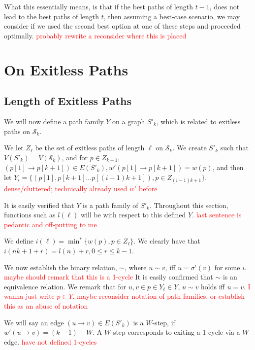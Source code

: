 \documentclass{article}
\theoremstyle{definition}
\newcommand{\edit}[1]{\textcolor{red}{#1}}
\begin{document}
{What this essentially means, is that if the best paths of length $t-1$, does not lead to the best paths of length $t$, then assuming a best-case scenario, we may consider if we used the second best option at one of these steps and proceeded optimally.\edit{ probably rewrite a reconsider where this is placed}

\section{On Exitless Paths} \label{bounding i}

\subsection{Length of Exitless Paths}

We will now define a path family $Y$ on a graph $S'_k$, which is related to exitless paths on $\mathcal{S}_k$.

\vspace{1.75em}

We let $Z_\ell$ be the set of exitless paths of length $\ell$ on $\mathcal{S}_k$. We create $S'_k$ such that $V(S'_k) = V(\mathcal{S}_k)$, and for $p \in Z_{k+1}$, $(p[1]\to p[k+1]) \in E(S'_k), w'(p[1]\to p[k+1]) = w(p)$, and then let $Y_i = \{(p[1], p[k+1]\dots p[(i-1)k+1]), p \in Z_{(i-1)k+1}\}$.\edit{ dense/cluttered; technically already used $w'$ before}

It is easily verified that $Y$ is a path family of $S'_k$. Throughout this section, functions such as $l(\ell)$ will be with respect to this defined $Y$.\edit{ last sentence is pedantic and off-putting to me} 

\vspace{1.75em}

We define $i(\ell) = \min^* \{ w(p), p \in Z_{\ell}\}$. We clearly have that $i(nk+1 +r) = l(n)+r, 0 \leq r \leq k-1$. 

We now establish the binary relation, $\sim$, where $u \sim v$, iff $u = \sigma^i(v)$ for some $i$.\edit{ maybe should remark that this is a 1-cycle} It is easily confirmed that $\sim$ is an equivalence relation. We remark that for $u,v \in p \in Y_\ell \in Y$, $u\sim v$ holds iff $u = v$.\edit{ I wanna just write $p \in Y$, maybe reconsider notation of path families, or establish this as an abuse of notation}

We will say an edge $(u\to v) \in E(S'_k)$ is a $W$-step, if $w'(u\to v) = (k-1)+W$. A $W$-step corresponds to exiting a 1-cycle via a $W$-edge.\edit{ have not defined 1-cycles} 

}
\end{document}
